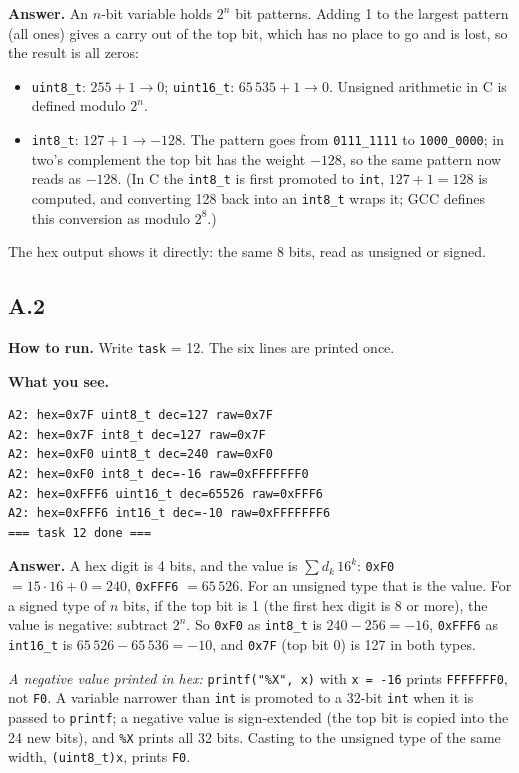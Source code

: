 \documentclass[11pt,a4paper]{article}
\newcommand{\lv}[1]{\texttt{#1}}                 %
\newcommand{\run}[1]{\textbf{How to run.} #1}
\newcommand{\see}[1]{\textbf{What you see.} #1}
\begin{document}
\textbf{Answer.} An $n$-bit variable holds $2^n$ bit patterns. Adding 1 to the largest pattern (all ones) gives a
carry out of the top bit, which has no place to go and is lost, so the result is all zeros:
\begin{itemize}
  \item \texttt{uint8\_t}: $255 + 1 \to 0$; \texttt{uint16\_t}: $65\,535 + 1 \to 0$. Unsigned arithmetic in C is
        defined modulo $2^n$.
  \item \texttt{int8\_t}: $127 + 1 \to -128$. The pattern goes from \texttt{0111\_1111} to \texttt{1000\_0000}; in two's
        complement the top bit has the weight $-128$, so the same pattern now reads as $-128$. (In C the
        \texttt{int8\_t} is first promoted to \texttt{int}, $127 + 1 = 128$ is computed, and converting 128 back into an
        \texttt{int8\_t} wraps it; GCC defines this conversion as modulo $2^8$.)
\end{itemize}
The hex output shows it directly: the same 8 bits, read as unsigned or signed.

\subsection*{A.2}
\run{Write \lv{task} = 12. The six lines are printed once.}

\see{}
\begin{lstlisting}[language={},basicstyle=\ttfamily\scriptsize]
A2: hex=0x7F uint8_t dec=127 raw=0x7F
A2: hex=0x7F int8_t dec=127 raw=0x7F
A2: hex=0xF0 uint8_t dec=240 raw=0xF0
A2: hex=0xF0 int8_t dec=-16 raw=0xFFFFFFF0
A2: hex=0xFFF6 uint16_t dec=65526 raw=0xFFF6
A2: hex=0xFFF6 int16_t dec=-10 raw=0xFFFFFFF6
=== task 12 done ===
\end{lstlisting}

\textbf{Answer.} A hex digit is 4 bits, and the value is $\sum d_k\,16^k$: \texttt{0xF0} $= 15 \cdot 16 + 0 = 240$,
\texttt{0xFFF6} $= 65\,526$. For an unsigned type that is the value. For a signed type of $n$ bits, if the top bit is
1 (the first hex digit is 8 or more), the value is negative: subtract $2^n$. So \texttt{0xF0} as \texttt{int8\_t} is
$240 - 256 = -16$, \texttt{0xFFF6} as \texttt{int16\_t} is $65\,526 - 65\,536 = -10$, and \texttt{0x7F} (top bit 0)
is 127 in both types.

\emph{A negative value printed in hex:} \texttt{printf("\%X", x)} with \texttt{x = -16} prints \texttt{FFFFFFF0}, not
\texttt{F0}. A variable narrower than \texttt{int} is promoted to a 32-bit \texttt{int} when it is passed to
\texttt{printf}; a negative value is sign-extended (the top bit is copied into the 24 new bits), and \texttt{\%X}
prints all 32 bits. Casting to the unsigned type of the same width, \texttt{(uint8\_t)x}, prints \texttt{F0}.
\end{document}
